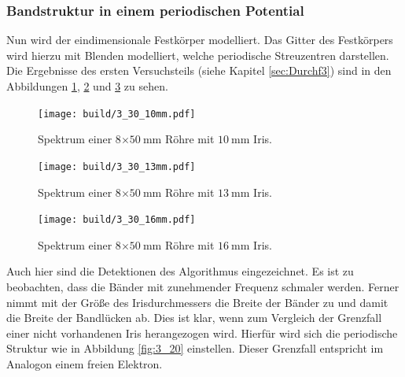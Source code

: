 \subsubsection{Bandstruktur in einem periodischen Potential}
\label{sec:3.3}
Nun wird der eindimensionale Festkörper modelliert. Das Gitter des Festkörpers wird hierzu mit Blenden modelliert, welche periodische Streuzentren darstellen. Die Ergebnisse des ersten Versuchsteils (siehe Kapitel \ref{sec:Durchf3}) sind in den Abbildungen \ref{fig:3_30}, \ref{fig:3_31} und \ref{fig:3_32} zu sehen.
\begin{figure}
  \centering  \texttt{[image: build/3\_30\_10mm.pdf]}  \caption{Spektrum einer 8$\times\SI{50}{\milli\meter}$ Röhre mit $\SI{10}{\milli\meter}$ Iris.} \label{fig:3_30}
\end{figure}
\begin{figure}
  \centering  \texttt{[image: build/3\_30\_13mm.pdf]}  \caption{Spektrum einer 8$\times\SI{50}{\milli\meter}$ Röhre mit $\SI{13}{\milli\meter}$ Iris.} \label{fig:3_31}
\end{figure}
\begin{figure}
  \centering  \texttt{[image: build/3\_30\_16mm.pdf]}  \caption{Spektrum einer 8$\times\SI{50}{\milli\meter}$ Röhre mit $\SI{16}{\milli\meter}$ Iris.} \label{fig:3_32}
\end{figure}
Auch hier sind die Detektionen des Algorithmus \cite{peakdetect} eingezeichnet. Es ist zu beobachten, dass die Bänder mit zunehmender Frequenz schmaler werden. Ferner nimmt mit der Größe des Irisdurchmessers die Breite der Bänder zu und damit die Breite der Bandlücken ab. Dies ist klar, wenn zum Vergleich der Grenzfall einer nicht vorhandenen Iris herangezogen wird. Hierfür wird sich die periodische Struktur wie in Abbildung \ref{fig:3_20} einstellen. Dieser Grenzfall entspricht im Analogon einem freien Elektron. \\

